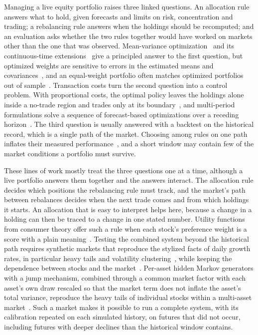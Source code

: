 Managing a live equity portfolio raises three linked questions. An allocation rule answers what to hold, given
forecasts and limits on risk, concentration and trading; a rebalancing rule answers when the holdings should be
recomputed; and an evaluation asks whether the two rules together would have worked on markets other than the one
that was observed. Mean-variance optimization~\cite{markowitz1952} and its continuous-time
extensions~\cite{merton1969} give a principled answer to the first question, but optimized weights are sensitive to
errors in the estimated means and covariances~\cite{michaud1989, ledoitWolf2004}, and an equal-weight portfolio
often matches optimized portfolios out of sample~\cite{demiguelGarlappiUppal2009}. Transaction costs turn the second
question into a control problem. With proportional costs, the optimal policy leaves the holdings alone inside a
no-trade region and trades only at its boundary~\cite{magillConstantinides1976, davisNorman1990}, and multi-period
formulations solve a sequence of forecast-based optimizations over a receding horizon~\cite{herzogDondiGeering2007,
boydEtAl2017}. The third question is usually answered with a backtest on the historical record, which is a single
path of the market. Choosing among rules on one path inflates their measured performance~\cite{baileyEtAl2014,
harveyLiu2015}, and a short window may contain few of the market conditions a portfolio must survive.

These lines of work mostly treat the three questions one at a time, although a live portfolio answers them
together and the answers interact. The allocation rule decides which positions the rebalancing rule must track, and
the market's path between rebalances decides when the next trade comes and from which holdings it starts. An
allocation that is easy to interpret helps here, because a change in a holding can then be traced to a change in one
stated number. Utility functions from consumer theory offer such a rule when each stock's preference weight is a
score with a plain meaning~\cite{cobbDouglas1928, arrowEtAl1961, stone1954, geary1950}. Testing the combined system
beyond the historical path requires synthetic markets that reproduce the stylized facts of daily growth rates, in
particular heavy tails and volatility clustering~\cite{mandelbrot1963, cont2001}, while keeping the dependence
between stocks and the market~\cite{sharpe1963}. Per-asset hidden Markov generators with a jump mechanism, combined
through a common market factor with each asset's own draw rescaled so that the market term does not inflate the
asset's total variance, reproduce the heavy tails of individual stocks within a multi-asset
market~\cite{alswaidan2026variance}. Such a market makes it possible to run a complete system, with its calibration
repeated on each simulated history, on futures that did not occur, including futures with deeper declines than the historical
window contains.

